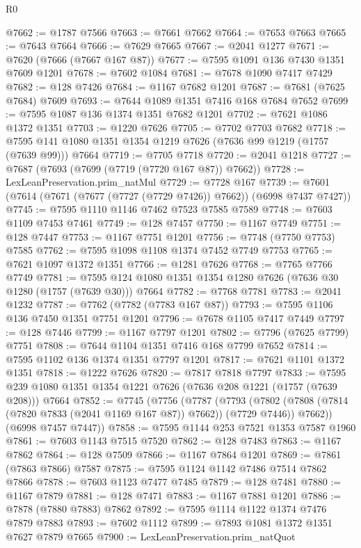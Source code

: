 \begin{lexlean}{R0}
\begin{coremodule}
@7662 := @1787 @7566
@7663 := @7661 @7662
@7664 := @7653 @7663
@7665 := @7643 @7664
@7666 := @7629 @7665
@7667 := @2041 @1277
@7671 := @7620 (@7666 (@7667 @167 @87))
@7677 := @7595 @1091 @136 @7430 @1351 @7609 @1201
@7678 := @7602 @1084
@7681 := @7678 @1090 @7417 @7429
@7682 := @128 @7426
@7684 := @1167 @7682 @1201
@7687 := @7681 (@7625 @7684) @7609
@7693 := @7644 @1089 @1351 @7416 @168 @7684 @7652
@7699 := @7595 @1087 @136 @1374 @1351 @7682 @1201
@7702 := @7621 @1086 @1372 @1351
@7703 := @1220 @7626
@7705 := @7702 @7703 @7682
@7718 := @7595 @141 @1080 @1351 @1354 @1219 @7626 (@7636 @99 @1219 (@1757 (@7639 @99))) @7664
@7719 := @7705 @7718
@7720 := @2041 @1218
@7727 := @7687 (@7693 (@7699 (@7719 (@7720 @167 @87)) @7662))
@7728 := LexLeanPreservation.prim_natMul
@7729 := @7728 @167
@7739 := @7601 (@7614 (@7671 (@7677 (@7727 (@7729 @7426)) @7662)) (@6998 @7437 @7427))
@7745 := @7595 @1110 @1146 @7462 @7523 @7585 @7589
@7748 := @7603 @1109 @7453 @7461
@7749 := @128 @7457
@7750 := @1167 @7749
@7751 := @128 @7447
@7753 := @1167 @7751 @1201
@7756 := @7748 (@7750 @7753) @7585
@7762 := @7595 @1098 @1108 @1374 @7452 @7749 @7753
@7765 := @7621 @1097 @1372 @1351
@7766 := @1281 @7626
@7768 := @7765 @7766 @7749
@7781 := @7595 @124 @1080 @1351 @1354 @1280 @7626 (@7636 @30 @1280 (@1757 (@7639 @30))) @7664
@7782 := @7768 @7781
@7783 := @2041 @1232
@7787 := @7762 (@7782 (@7783 @167 @87))
@7793 := @7595 @1106 @136 @7450 @1351 @7751 @1201
@7796 := @7678 @1105 @7417 @7449
@7797 := @128 @7446
@7799 := @1167 @7797 @1201
@7802 := @7796 (@7625 @7799) @7751
@7808 := @7644 @1104 @1351 @7416 @168 @7799 @7652
@7814 := @7595 @1102 @136 @1374 @1351 @7797 @1201
@7817 := @7621 @1101 @1372 @1351
@7818 := @1222 @7626
@7820 := @7817 @7818 @7797
@7833 := @7595 @239 @1080 @1351 @1354 @1221 @7626 (@7636 @208 @1221 (@1757 (@7639 @208))) @7664
@7852 := @7745
    (@7756
      (@7787
        (@7793
          (@7802 (@7808 (@7814 (@7820 @7833 (@2041 @1169 @167 @87)) @7662)) (@7729 @7446))
          @7662))
      (@6998 @7457 @7447))
@7858 := @7595 @1144 @253 @7521 @1353 @7587 @1960
@7861 := @7603 @1143 @7515 @7520
@7862 := @128 @7483
@7863 := @1167 @7862
@7864 := @128 @7509
@7866 := @1167 @7864 @1201
@7869 := @7861 (@7863 @7866) @7587
@7875 := @7595 @1124 @1142 @7486 @7514 @7862 @7866
@7878 := @7603 @1123 @7477 @7485
@7879 := @128 @7481
@7880 := @1167 @7879
@7881 := @128 @7471
@7883 := @1167 @7881 @1201
@7886 := @7878 (@7880 @7883) @7862
@7892 := @7595 @1114 @1122 @1374 @7476 @7879 @7883
@7893 := @7602 @1112
@7899 := @7893 @1081 @1372 @1351 @7627 @7879 @7665
@7900 := LexLeanPreservation.prim_natQuot

\end{coremodule}
\end{lexlean}
